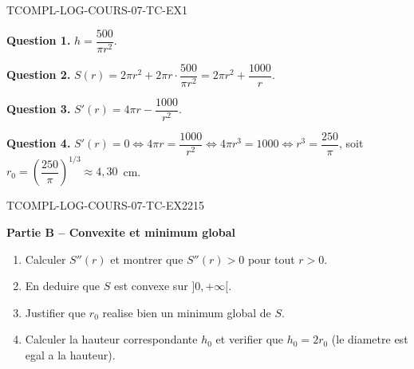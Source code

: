 \begin{corrige}{TCOMPL-LOG-COURS-07-TC-EX1}

\textbf{Question 1.} $h = \dfrac{500}{\pi r^2}$.

\textbf{Question 2.} $S(r) = 2\pi r^2 + 2\pi r \cdot \dfrac{500}{\pi r^2} = 2\pi r^2 + \dfrac{1000}{r}$.


\textbf{Question 3.} $S'(r) = 4\pi r - \dfrac{1000}{r^2}$.

\textbf{Question 4.} $S'(r) = 0 \iff 4\pi r = \dfrac{1000}{r^2} \iff 4\pi r^3 = 1000 \iff r^3 = \dfrac{250}{\pi}$, soit $r_0 = \left(\dfrac{250}{\pi}\right)^{1/3} \approx 4{,}30$~cm.

\end{corrige}

\bigskip


\begin{exercice}{TCOMPL-LOG-COURS-07-TC-EX2}{2}{15}

\textbf{Partie B -- Convexite et minimum global}

\begin{enumerate}
  \item Calculer $S''(r)$ et montrer que $S''(r) > 0$ pour tout $r > 0$.
  \item En deduire que $S$ est convexe sur $]0, +\infty[$.
  \item Justifier que $r_0$ realise bien un minimum global de $S$.
  \item Calculer la hauteur correspondante $h_0$ et verifier que $h_0 = 2r_0$ (le diametre est egal a la hauteur).
\end{enumerate}

\end{exercice}

